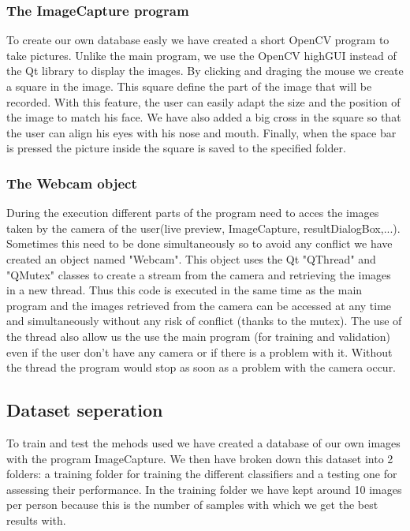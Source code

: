 \subsubsection{The ImageCapture program}
To create our own database easly we have created a short OpenCV program to take pictures. Unlike the main program, we use the OpenCV highGUI instead 
of the Qt library to display the images. By clicking and draging the mouse we create a square in the image. This square define the part of the image 
that will be recorded. With this feature, the user can easily adapt the size and the position of the image to match his face. We have also added a 
big cross in the square so that the user can align his eyes with his nose and mouth.
Finally, when the space bar is pressed the picture inside the square is saved to the specified folder.

\subsubsection{The Webcam object}
During the execution different parts of the program need to acces the images taken by the camera of the user(live preview, ImageCapture, 
resultDialogBox,...). Sometimes this need to be done simultaneously so to avoid any conflict we have created an object named "Webcam". This object 
uses the Qt "QThread" and "QMutex" classes to create a stream from the camera and retrieving the images in a new thread. Thus this code is executed 
in the same time as the main program and the images retrieved from the camera can be accessed at any time and simultaneously without any risk of 
conflict (thanks to the mutex).
The use of the thread also allow us the use the main program (for training and validation) even if the user don't have any camera or if there is a 
problem with it. Without the thread the program would stop as soon as a problem with the camera occur.

\subsection{Dataset seperation}

To train and test the mehods used we have created a database of our own images with the program ImageCapture. We then have broken down this 
dataset into 2 folders: a training folder for training the different classifiers and a testing one for assessing 
their performance. In the training folder we have kept around 10 images per person because this is the number of samples with which we get the best 
results with.


